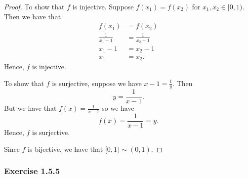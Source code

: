 \begin{enumerate}
\begin{proof}
        To show that \( f \) is injective. Suppose \( f(x_1) = f(x_2) \) for \( x_1, x_2 \in [0,1)\). Then we have that 
        \begin{align*}
        f(x_1)&=f(x_2) \\
        \frac{1}{x_1-1} &= \frac{1}{x_2-1} \\
        x_1 - 1 &= x_2 - 1 \\
        x_1 &= x_2.
        \end{align*}
        Hence, \( f \) is injective. 

        To show that \( f \) is surjective, suppose we have \( x-1 = \frac{1}{y} \). Then 
        \[ y = \frac{1}{x-1}.\] But we have that \( f(x) = \frac{1}{x-1}\) so we have 
        \[ f(x) = \frac{1}{x-1} = y. \] Hence, \( f \) is surjective.

        Since \( f \) is bijective, we have that \( [0,1) \sim (0,1)\).
    \end{proof}
\end{enumerate}





\subsubsection{Exercise 1.5.5}


